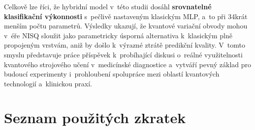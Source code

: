 \documentclass[12pt, a4paper]{report}
\begin{document}
Celkově lze říci, že hybridní model v~této studii dosáhl \textbf{srovnatelné klasifikační výkonnosti} s~pečlivě nastaveným klasickým MLP, a~to při 34krát menším počtu parametrů. Výsledky ukazují, že kvantové variační obvody mohou v~éře NISQ sloužit jako parametricky úsporná alternativa k~klasickým plně propojeným vrstvám, aniž by došlo k~výrazné ztrátě predikční kvality. V~tomto smyslu představuje práce příspěvek k~probíhající diskusi o~reálné využitelnosti kvantového strojového učení v~medicínské diagnostice a~vytváří pevný základ pro budoucí experimenty i~prohloubení spolupráce mezi oblastí kvantových technologií a~klinickou praxí.

\printbibliography[title={Seznam použité literatury}, heading=bibintoc]

\chapter*{Seznam použitých zkratek}
\end{document}
